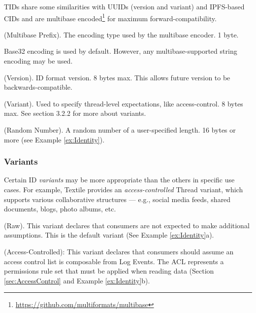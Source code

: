 \documentclass{textile}
\begin{document}
TIDs share some similarities with UUIDs \cite{leachUniversallyUniqueIDentifier2005} (version and variant) and IPFS-based CIDs and are multibase encoded\footnote{\url{https://github.com/multiformats/multibase}} for maximum forward-compatibility.

\begin{definition}
(Multibase Prefix). The encoding type used by the multibase encoder. 1 byte.
\end{definition}

Base32 encoding is used by default. However, any multibase-supported string encoding may be used.

\begin{definition}
(Version). ID format version. 8 bytes max. This allows future version to be backwards-compatible.
\end{definition}

\begin{definition}
(Variant). Used to specify thread-level expectations, like access-control. 8 bytes max. See section 3.2.2 for more about variants.
\end{definition}

\begin{definition}
(Random Number). A random number of a user-specified length. 16 bytes or more  (see Example \ref{ex:Identity}).
\end{definition}

\subsubsection{Variants}

Certain ID \emph{variants} may be more appropriate than the others in specific use cases. For example, Textile provides an \emph{access-controlled} Thread variant, which supports various collaborative structures --- e.g., social media feeds, shared documents, blogs, photo albums, etc.

\begin{definition}
(Raw). This variant declares that consumers are not expected to make additional assumptions. This is the default variant (See Example \ref{ex:Identity}a).
\end{definition}

\begin{definition}
(Access-Controlled): This variant declares that consumers should assume an access control list is composable from Log Events. The ACL represents a permissions rule set that must be applied when reading data (Section  \ref{sec:AccessControl} and Example \ref{ex:Identity}b).
\end{definition}
\end{document}

